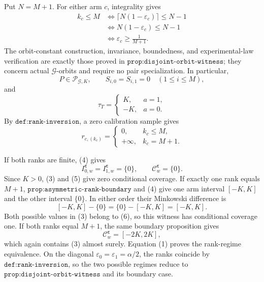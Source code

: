 Put \(N=M+1\). For either arm \(c\), integrality gives
\[
\begin{aligned}
k_c\le M
&\Longleftrightarrow
\lceil N(1-\varepsilon_c)\rceil\le N-1\\
&\Longleftrightarrow
N(1-\varepsilon_c)\le N-1\\
&\Longleftrightarrow
\varepsilon_c\ge\frac1{M+1}.
\end{aligned}
\tag{1}
\]
The orbit-constant construction, invariance, boundedness, and experimental-law verification are exactly those proved in \(\texttt{prop:disjoint-orbit-witness}\); they concern actual \(\mathcal G\)-orbits and require no pair specialization. In particular,
\[
P\in\mathcal P_{\mathcal G,K},
\qquad
S_{i,0}=S_{i,1}=0\quad(1\le i\le M),
\tag{2}
\]
and
\[
\tau_T=
\begin{cases}
K,&a=1,\\
-K,&a=0.
\end{cases}
\tag{3}
\]
By \(\texttt{def:rank-inversion}\), a zero calibration sample gives
\[
r_{c,(k_c)}
=
\begin{cases}
0,&k_c\le M,\\
+\infty,&k_c=M+1.
\end{cases}
\tag{4}
\]

If both ranks are finite, (4) gives
\[
I^{\boldsymbol\varepsilon}_{0,w}
=
I^{\boldsymbol\varepsilon}_{1,w}
=
\{0\},
\qquad
\mathcal C^{\boldsymbol\varepsilon}_w=\{0\}.
\tag{5}
\]
Since \(K>0\), (3) and (5) give zero conditional coverage. If exactly one rank equals \(M+1\), \(\texttt{prop:asymmetric-rank-boundary}\) and (4) give one arm interval \([-K,K]\) and the other interval \(\{0\}\). In either order their Minkowski difference is
\[
[-K,K]-\{0\}=\{0\}-[-K,K]=[-K,K].
\tag{6}
\]
Both possible values in (3) belong to (6), so this witness has conditional coverage one. If both ranks equal \(M+1\), the same boundary proposition gives
\[
\mathcal C^{\boldsymbol\varepsilon}_w=[-2K,2K],
\tag{7}
\]
which again contains (3) almost surely. Equation (1) proves the rank-regime equivalence. On the diagonal \(\varepsilon_0=\varepsilon_1=\alpha/2\), the ranks coincide by \(\texttt{def:rank-inversion}\), so the two possible regimes reduce to \(\texttt{prop:disjoint-orbit-witness}\) and its boundary case.